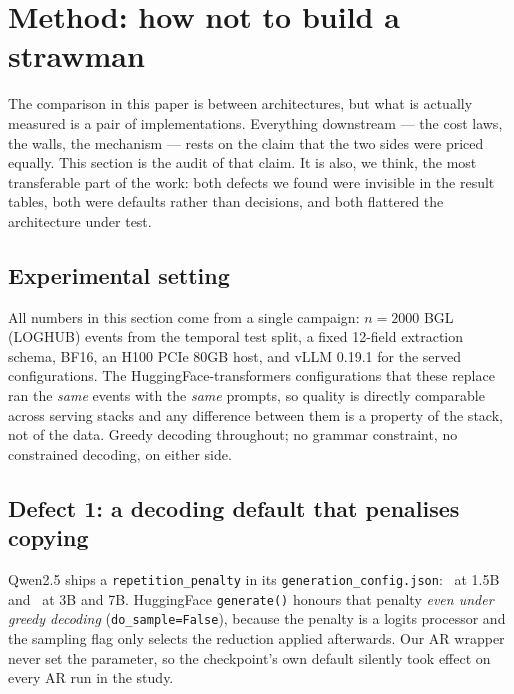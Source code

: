 \section{Method: how not to build a strawman}
\label{sec:method}

The comparison in this paper is between architectures, but what is actually
measured is a pair of implementations. Everything downstream --- the cost laws,
the walls, the mechanism --- rests on the claim that the two sides were priced
equally. This section is the audit of that claim. It is also, we think, the most
transferable part of the work: both defects we found were invisible in the
result tables, both were defaults rather than decisions, and both flattered the
architecture under test.

\subsection{Experimental setting}

All numbers in this section come from a single campaign: $n = 2000$ BGL
(LOGHUB) events from the temporal test split, a fixed 12-field extraction
schema, BF16, an H100 PCIe 80GB host, and vLLM 0.19.1 for the served
configurations. The HuggingFace-transformers configurations that these replace
ran the \emph{same} events with the \emph{same} prompts, so quality is directly
comparable across serving stacks and any difference between them is a property
of the stack, not of the data. Greedy decoding throughout; no grammar
constraint, no constrained decoding, on either side.

\subsection{Defect 1: a decoding default that penalises copying}
\label{sec:defect1}

Qwen2.5 ships a \texttt{repetition\_penalty} in its \texttt{generation\_config.json}:
\repPenaltySmall\ at 1.5B and \repPenaltyLarge\ at 3B and 7B. HuggingFace
\texttt{generate()} honours that penalty \emph{even under greedy decoding}
(\texttt{do\_sample=False}), because the penalty is a logits processor and the
sampling flag only selects the reduction applied afterwards. Our AR wrapper
never set the parameter, so the checkpoint's own default silently took effect on
every AR run in the study.

